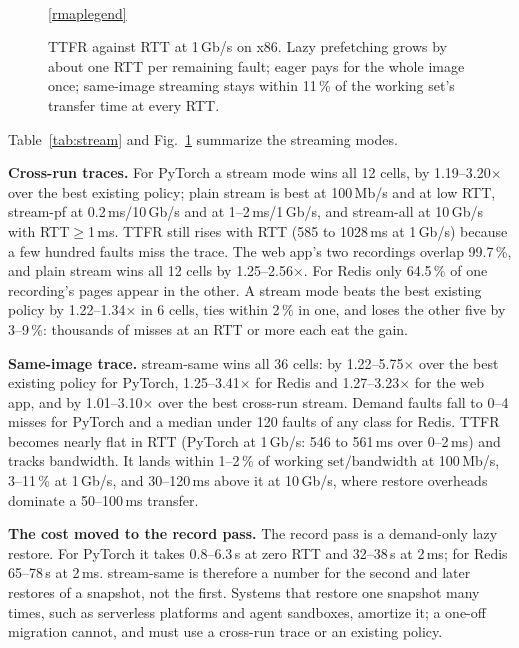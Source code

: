 \documentclass[conference]{IEEEtran}
\newcommand{\mode}[1]{\textsf{#1}}
\begin{document}
\begin{figure}[t]
\\[2pt]\ref{rmaplegend}
\caption{TTFR against RTT at 1\,Gb/s on x86. Lazy prefetching grows by
about one RTT per remaining fault; eager pays for the whole image once;
same-image streaming stays within 11\,\% of the working set's transfer
time at every RTT.}
\label{fig:rtt}
\end{figure}

Table~\ref{tab:stream} and Fig.~\ref{fig:rtt} summarize the streaming modes.

\textbf{Cross-run traces.} For PyTorch a stream mode wins all 12 cells,
by 1.19--3.20$\times$ over the best existing policy; plain \mode{stream} is
best at 100\,Mb/s and at low RTT, \mode{stream-pf} at 0.2\,ms/10\,Gb/s and
at 1--2\,ms/1\,Gb/s, and \mode{stream-all} at 10\,Gb/s with
RTT${}\ge{}$1\,ms. TTFR still rises with RTT (585 to
1028\,ms at 1\,Gb/s) because a few hundred faults miss the trace. The web
app's two recordings overlap 99.7\,\%, and plain \mode{stream} wins all 12
cells by 1.25--2.56$\times$. For Redis only 64.5\,\% of one recording's
pages appear in the other. A stream mode beats the best existing policy by
1.22--1.34$\times$ in 6 cells, ties within 2\,\% in one, and loses the
other five by 3--9\,\%: thousands of misses at an RTT or more each eat the gain.

\textbf{Same-image trace.} \mode{stream-same} wins all 36 cells: by
1.22--5.75$\times$ over the best existing policy for PyTorch,
1.25--3.41$\times$ for Redis and 1.27--3.23$\times$ for the web app, and by
1.01--3.10$\times$ over the best cross-run stream. Demand faults fall to
0--4 misses for PyTorch and a median under 120 faults of any class for Redis.
TTFR becomes nearly flat in RTT (PyTorch at 1\,Gb/s: 546 to 561\,ms over
0--2\,ms) and tracks bandwidth. It lands within 1--2\,\% of
$\text{working set}/\text{bandwidth}$ at 100\,Mb/s, 3--11\,\% at
1\,Gb/s, and 30--120\,ms above it at 10\,Gb/s, where restore overheads
dominate a 50--100\,ms transfer.

\textbf{The cost moved to the record pass.} The record pass is a
demand-only lazy restore. For PyTorch it takes 0.8--6.3\,s at zero RTT
and 32--38\,s at 2\,ms; for Redis 65--78\,s at 2\,ms. \mode{stream-same}
is therefore a number for the second and later restores of a snapshot, not
the first. Systems that restore one snapshot many times, such as
serverless platforms and agent sandboxes, amortize it; a one-off migration
cannot, and must use a cross-run trace or an existing policy.
\end{document}
